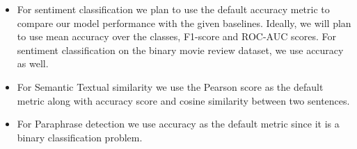 \documentclass{article}
\begin{document}
\begin{itemize}
    \item For sentiment classification we plan to use the default accuracy metric to compare our model performance with the given baselines. Ideally, we will plan to use mean accuracy over the classes, F1-score and ROC-AUC scores. For sentiment classification on the binary movie review dataset, we use accuracy as well.

    \item For Semantic Textual similarity we use the Pearson score as the default metric along with accuracy score and cosine similarity between two sentences. 

    \item For Paraphrase detection we use accuracy as the default metric since it is a binary classification problem. 

\end{itemize}

\newpage


\end{document}
